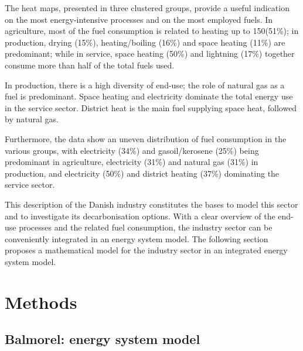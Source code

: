 \documentclass[review]{elsarticle}
\begin{document}
The heat maps, presented in three clustered groups, provide a useful indication on the most energy-intensive processes and on the most employed fuels. 
In agriculture, most of the fuel consumption is related to heating up to 150\textdegree (51\%); in production, drying (15\%), heating/boiling (16\%) and space heating (11\%) are predominant; while in service, space heating (50\%) and lightning (17\%) together consume more than half of the total fuels used.

In production, there is a high diversity of end-use; the role of natural gas as a fuel is predominant. 
Space heating and electricity dominate the total energy use in the service sector. District heat is the main fuel supplying space heat, followed by natural gas.

Furthermore, the data show an uneven distribution of fuel consumption in the various groups, with electricity (34\%) and gasoil/kerosene (25\%) being predominant in agriculture, electricity (31\%) and natural gas (31\%) in production, and electricity (50\%) and district heating (37\%) dominating the service sector.

This description of the Danish industry constitutes the bases to model this sector and to investigate its decarbonisation options. With a clear overview of the end-use processes and the related fuel consumption, the industry sector can be conveniently integrated in an energy system model. 
The following section proposes a mathematical model for the industry sector in an integrated energy system model.




\section{Methods} \label{meths}

\subsection{Balmorel: energy system model}
\end{document}
